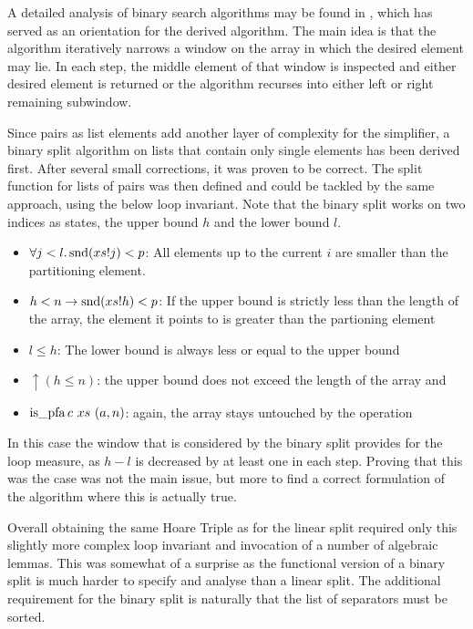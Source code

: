 A detailed analysis of binary search algorithms
may be found in \parencite{DBLP:journals/csedu/Montague91},
which has served as an orientation for the derived algorithm.
The main idea is that the algorithm iteratively
narrows a window on the array in which the desired element may lie.
In each step, the middle element of that window is inspected
and either desired element is returned or the algorithm
recurses into either left or right remaining subwindow.

Since pairs as list elements
add another layer of complexity for the simplifier,
a binary split algorithm on lists that contain
only single elements has been derived first.
After several small corrections,
it was proven to be correct.
The split function for lists of pairs was then defined
and could be tackled by the same approach,
using the below loop invariant.
Note that the binary split works on two indices
as states, the upper bound $h$ and the lower bound $l$.

\begin{itemize}
    \item $\forall j<l. \operatorname{snd} (xs!j) < p$: All elements up to the current $i$
        are smaller than the partitioning element.
    \item $h<n \rightarrow \operatorname{snd} (xs!h) < p$: If the upper bound is strictly less than the length
    of the array, the element it points to is greater than the partioning element
    \item $l \leq h$: The lower bound is always less or equal to the upper bound
    \item $\uparrow(h \leq n)$: the upper bound does not exceed the length of the array and
    \item $\operatorname{is\_pfa} c\ xs\ (a,n)$: again, the array stays untouched by the operation
\end{itemize}

In this case the window that is considered by the binary split
provides for the loop measure, as $h-l$ is decreased by at least one in each step.
Proving that this was the case was not the main issue,
but more to find a correct formulation of the algorithm
where this is actually true.

Overall obtaining the same Hoare Triple
as for the linear split required only
this slightly more complex loop invariant
and invocation of a number of algebraic lemmas.
This was somewhat of a surprise as the functional
version of a binary split is much harder to
specify and analyse than a linear split.
The additional requirement for the binary split is
naturally that the list of separators must be sorted.

